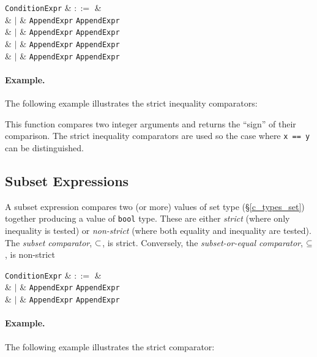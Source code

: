 \begin{syntax}
  \verb+ConditionExpr+ & $::=$ &\\
  & $|$ & \verb+AppendExpr+ \token{<} \verb+AppendExpr+\\
  & $|$ & \verb+AppendExpr+ \token{<=} \verb+AppendExpr+\\
  & $|$ & \verb+AppendExpr+ \token{=>} \verb+AppendExpr+\\
  & $|$ & \verb+AppendExpr+ \token{>} \verb+AppendExpr+\\
\end{syntax}

\paragraph{Example.} The following example illustrates the strict inequality comparators:



This function compares two integer arguments and returns the ``sign'' of their comparison.  The strict inequality comparators are used so the case where \lstinline{x == y} can be distinguished.

\subsection{Subset Expressions}
\label{c_expr_relational}
A subset expression compares two (or more) values of set type (\S\ref{c_types_set}) together producing a value of \lstinline{bool} type.  These are either {\em strict} (where only inequality is tested)  or {\em non-strict} (where both equality and inequality are tested).  The {\em subset comparator}, ${\tt\subset}$, is strict.  Conversely, the {\em subset-or-equal comparator}, ${\tt\subseteq}$, is non-strict

\begin{syntax}
  \verb+ConditionExpr+ & $::=$ &\\
  & $|$ & \verb+AppendExpr+ \token{$\subset$} \verb+AppendExpr+\\
  & $|$ & \verb+AppendExpr+ \token{$\subseteq$} \verb+AppendExpr+\\
\end{syntax}

\paragraph{Example.} The following example illustrates the strict comparator:

